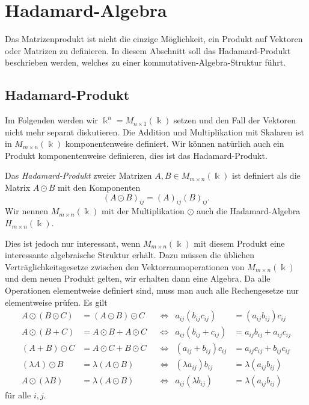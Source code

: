 %
%
%
\section{Hadamard-Algebra
\label{buch:section:hadamard-algebra}}
Das Matrizenprodukt ist nicht die einzige Möglichkeit, ein Produkt auf
Vektoren oder Matrizen zu definieren.
In diesem Abschnitt soll das Hadamard-Produkt beschrieben werden,
welches zu einer kommutativen-Algebra-Struktur führt.

%
%
\subsection{Hadamard-Produkt
\label{buch:vektorenmatrizen:subsection:hadamard-produkt}}
Im Folgenden werden wir $\Bbbk^n =M_{n\times 1}(\Bbbk)$ setzen
und den Fall der Vektoren nicht mehr separat diskutieren.
Die Addition und Multiplikation mit Skalaren ist in 
$M_{m\times n}(\Bbbk)$ komponentenweise definiert.
Wir können natürlich auch ein Produkt komponentenweise definieren,
dies ist das Hadamard-Produkt.

\begin{definition}
Das {\em Hadamard-Produkt} zweier Matrizen
$A,B\in M_{m\times n}(\Bbbk)$ ist definiert als die Matrix
$A\odot B$ 
mit den Komponenten
\[
(A\odot B)_{ij} = (A)_{ij} (B)_{ij}.
\]
Wir nennen $M_{m\times n}(\Bbbk)$ mit der Multiplikation $\odot$ 
auch die Hadamard-Algebra $H_{m\times n}(\Bbbk)$.
\end{definition}

Dies ist jedoch nur interessant, wenn $M_{m\times n}(\Bbbk)$ mit diesem
Produkt eine interessante algebraische Struktur erhält.
Dazu müssen die üblichen Verträglichkeitsgesetze zwischen den
Vektorraumoperationen von $M_{m\times n}(\Bbbk)$ und dem neuen Produkt
gelten, wir erhalten dann eine Algebra.
Da alle Operationen elementweise definiert sind, muss man auch alle
Rechengesetze nur elementweise prüfen.
Es gilt
\begin{align*}
A\odot(B\odot C) &= (A\odot B)\odot C
&&\Leftrightarrow&
a_{ij}(b_{ij}c_{ij}) &= (a_{ij}b_{ij})c_{ij}
\\
A\odot(B+C) &= A\odot B + A\odot C
&&\Leftrightarrow&
a_{ij}(b_{ij}+c_{ij}) &= a_{ij}b_{ij} + a_{ij}c_{ij}
\\
(A+B)\odot C&=A\odot C+B\odot C
&&\Leftrightarrow&
(a_{ij}+b_{ij})c_{ij}&=a_{ij}c_{ij} + b_{ij}c_{ij}
\\
(\lambda A)\odot B &= \lambda (A\odot B)
&&\Leftrightarrow&
(\lambda a_{ij})b_{ij}&=\lambda(a_{ij}b_{ij})
\\
A\odot(\lambda B)&=\lambda(A\odot B)
&&\Leftrightarrow&
a_{ij}(\lambda b_{ij})&=\lambda(a_{ij}b_{ij})
\end{align*}
für alle $i,j$.

